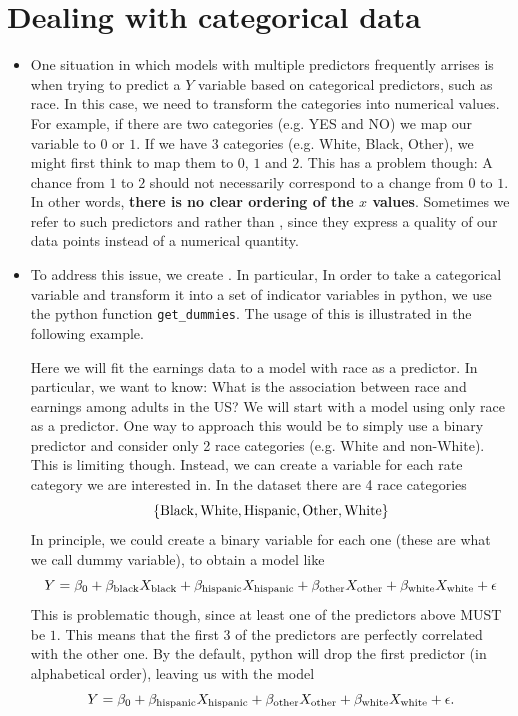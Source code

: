 \section{Dealing with categorical data}
\begin{itemize}
\item One situation in which models with multiple predictors frequently arrises is when trying to predict a $Y$ variable based on categorical predictors, such as race. In this case, we need to transform the categories  into numerical values. For example, if there are two categories (e.g. YES and NO) we map our variable to $0$ or $1$. If we have $3$ categories (e.g. White, Black, Other), we might first think to map them to $0$, $1$ and $2$. This has a problem though: A chance from $1$ to $2$ should not necessarily  correspond to a change from $0$ to $1$. In other words, {\bf there is no clear ordering of the $x$ values}.  Sometimes we refer to such predictors and  rather than , since they express a quality of our data points instead of a numerical quantity. 
\item To address this issue, we create . 
In particular, In order to take a categorical variable and transform it into a set of indicator variables in python, we use the python function \verb!get_dummies!. The usage of this is illustrated in the following example. 



\begin{example}
Here we will fit the earnings data to a model with race as a predictor. In particular, we want to know: What is the association between race and earnings among adults in the US?  We will start with a model using only race as a predictor. One way to approach this would be to simply use a binary predictor and consider only 2 race categories (e.g. White and non-White). This is limiting though. Instead, we can create a variable for each rate category we are interested in. In the dataset there are 4 race categories
\begin{equation*}
\{{\rm Black},{\rm White},{\rm Hispanic},{\rm Other},{\rm White}\}
\end{equation*}
In principle, we could create a binary variable for each one (these are what we call dummy variable), to obtain a model like 
\begin{equation*}
Y = \beta_0 + \beta_{\rm black}X_{\rm black} + \beta_{\rm hispanic}X_{\rm hispanic}+ \beta_{\rm other }X_{\rm other}+ \beta_{\rm white}X_{\rm white} + \epsilon 
\end{equation*}
This is problematic though, since at least one of the predictors above MUST be $1$. This means that the first 3 of the predictors are perfectly correlated with the other one. By the default, python will drop the first predictor (in alphabetical order), leaving us with the model
\begin{equation*}
Y = \beta_0 + \beta_{\rm hispanic}X_{\rm hispanic}+ \beta_{\rm other }X_{\rm other}+ \beta_{\rm white}X_{\rm white} + \epsilon. \\
\end{equation*}


\end{example}
\end{itemize}
